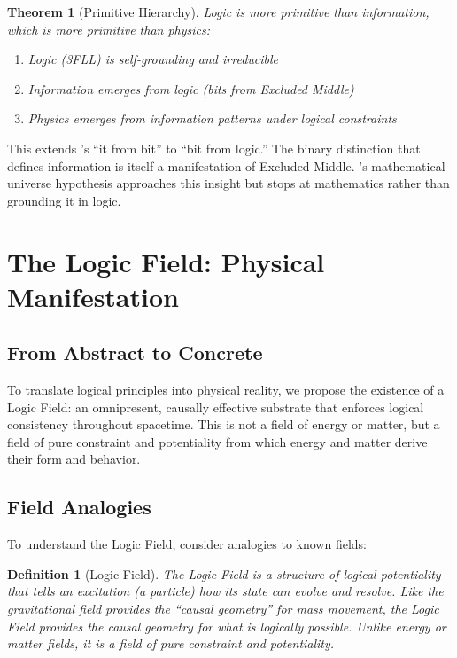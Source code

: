 \documentclass[12pt,a4paper]{article}
\newtheorem{theorem}{Theorem}
\newtheorem{definition}{Definition}
\begin{document}
\begin{theorem}[Primitive Hierarchy]
Logic is more primitive than information, which is more primitive than physics:
\begin{enumerate}
\item Logic (3FLL) is self-grounding and irreducible
\item Information emerges from logic (bits from Excluded Middle)
\item Physics emerges from information patterns under logical constraints
\end{enumerate}
\end{theorem}

This extends \citet{wheeler1990information}'s ``it from bit'' to ``bit from logic.'' The binary distinction that defines information is itself a manifestation of Excluded Middle. \citet{tegmark2008mathematical}'s mathematical universe hypothesis approaches this insight but stops at mathematics rather than grounding it in logic.

\section{The Logic Field: Physical Manifestation}

\subsection{From Abstract to Concrete}

To translate logical principles into physical reality, we propose the existence of a Logic Field: an omnipresent, causally effective substrate that enforces logical consistency throughout spacetime. This is not a field of energy or matter, but a field of pure constraint and potentiality from which energy and matter derive their form and behavior.

\subsection{Field Analogies}

To understand the Logic Field, consider analogies to known fields:

\begin{definition}[Logic Field]
The Logic Field is a structure of logical potentiality that tells an excitation (a particle) how its state can evolve and resolve. Like the gravitational field provides the ``causal geometry'' for mass movement, the Logic Field provides the causal geometry for what is logically possible. Unlike energy or matter fields, it is a field of pure constraint and potentiality.
\end{definition}
\end{document}
